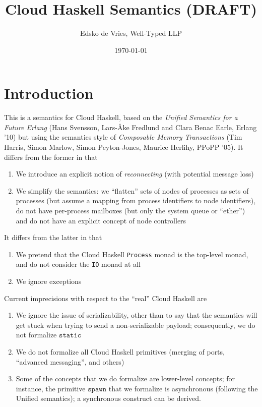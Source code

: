 \documentclass{article}
\newcommand{\sSpawn}{\mathtt{spawn}}
\begin{document}
\title{Cloud Haskell Semantics (DRAFT)}
\author{Edsko de Vries, Well-Typed LLP}
\date{\today}

\maketitle

\section{Introduction}

This is a semantics for Cloud Haskell, based on the \textit{Unified Semantics
for a Future Erlang} (Hans Svensson, Lars-\AA{}ke Fredlund and Clara Benac
Earle, Erlang '10) but using the semantics style of \textit{Composable Memory
Transactions} (Tim Harris, Simon Marlow, Simon Peyton-Jones, Maurice Herlihy,
PPoPP '05). It differs from the former in that
%
\begin{enumerate}
\item We introduce an explicit notion of \textit{reconnecting} (with potential
message loss)
\item We simplify the semantics: we ``flatten'' sets of nodes of processes as
sets of processes (but assume a mapping from process identifiers to node
identifiers), do not have per-process mailboxes (but only the system queue or
``ether'') and do not have an explicit concept of node controllers
\end{enumerate}
%
It differs from the latter in that
%
\begin{enumerate}
\item We pretend that the Cloud Haskell \texttt{Process} monad is the top-level
monad, and do not consider the \texttt{IO} monad at all
\item We ignore exceptions
\end{enumerate}
%
Current imprecisions with respect to the ``real'' Cloud Haskell are
%
\begin{enumerate}
\item We ignore the issue of serializability, other than to say that the
semantics will get stuck when trying to send a non-serializable payload;
consequently, we do not formalize $\mathtt{static}$
\item We do not formalize all Cloud Haskell primitives (merging of ports,
``advanced messaging'', and others)
\item Some of the concepts that we do formalize are lower-level concepts; for
instance, the primitive $\sSpawn$ that we formalize is asynchronous (following
the Unified semantics); a synchronous construct can be derived.
\end{enumerate}
\end{document}
